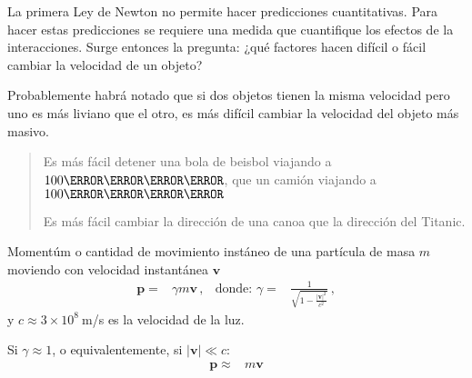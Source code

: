 La primera Ley de Newton no permite hacer predicciones cuantitativas. Para hacer estas predicciones se requiere una medida que cuantifique los efectos de la interacciones. Surge entonces la pregunta: ¿qué factores hacen difícil o fácil cambiar la velocidad de un objeto?

Probablemente habrá notado que si dos objetos tienen la misma velocidad pero uno es más liviano que el otro, es más difícil cambiar la velocidad del objeto más masivo. 

\begin{frame}[plain]
  \begin{quote}
  Es más fácil detener una bola de beisbol viajando a $100\kilo\meter\per\hour$, que un camión viajando a $100\kilo\meter\per\hour$

Es más fácil cambiar la dirección de una canoa que la dirección del Titanic.
\end{quote}
\end{frame}

Momentúm o cantidad de movimiento instáneo de una partícula de masa $m$ moviendo con velocidad instantánea $\mathbf{v}$
\begin{align}
  \mathbf{p}=&\gamma m \mathbf{v}\,, &\text{donde: } \gamma=&\frac{1}{\sqrt{1-\frac{|\mathbf{v}|^2}{c^2}}}\,,
\end{align}
y $c\approx 3\times 10^8\ $m/s es la velocidad de la luz.

Si $\gamma\approx1$, o equivalentemente, si $|\mathbf{v}|\ll c$:
\begin{align}
  \mathbf{p}\approx &m \mathbf{v}
\end{align}


\begin{extrapage}
  \newpage
  
  \qquad
  \newpage
\end{extrapage}

